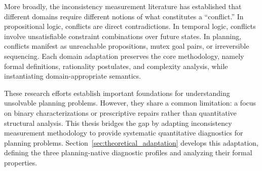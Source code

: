 More broadly, the inconsistency measurement literature has established that different domains require different notions of what constitutes a ``conflict.'' In propositional logic, conflicts are direct contradictions. In temporal logic, conflicts involve unsatisfiable constraint combinations over future states. In planning, conflicts manifest as unreachable propositions, mutex goal pairs, or irreversible sequencing. Each domain adaptation preserves the core methodology, namely formal definitions, rationality postulates, and complexity analysis, while instantiating domain-appropriate semantics.

These research efforts establish important foundations for understanding unsolvable planning problems. However, they share a common limitation: a focus on binary characterizations or prescriptive repairs rather than quantitative structural analysis. This thesis bridges the gap by adapting inconsistency measurement methodology to provide systematic quantitative diagnostics for planning problems. Section~\ref{sec:theoretical_adaptation} develops this adaptation, defining the three planning-native diagnostic profiles and analyzing their formal properties.
